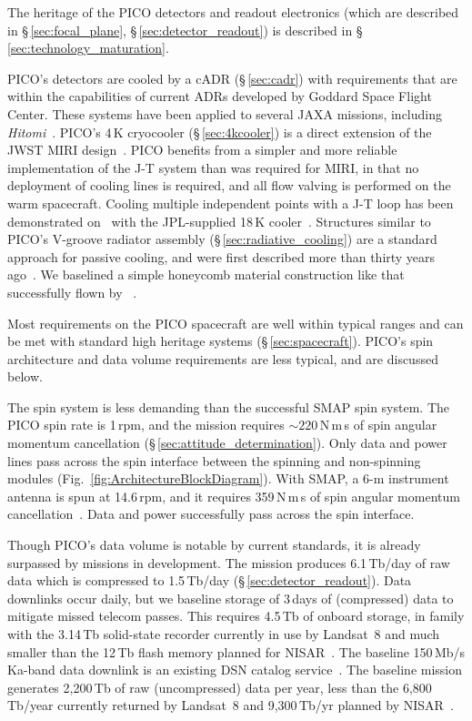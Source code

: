 The heritage of the PICO detectors and readout electronics (which are described in \S\,\ref{sec:focal_plane}, \S\,\ref{sec:detector_readout}) is described in \S\,\ref{sec:technology_maturation}.

PICO's detectors are cooled by a cADR (\S\,\ref{sec:cadr}) with requirements that are within the capabilities of current ADRs developed by Goddard Space Flight Center. These systems have been applied to several JAXA missions, including \textit{Hitomi}~\citep{Shirron2016}. PICO's 4\,K cryocooler (\S\,\ref{sec:4kcooler}) is a direct extension of the JWST MIRI design~\citep{Durand2008,Rabb2013}. PICO benefits from a simpler and more reliable implementation of the J-T system than was required for MIRI, in that no deployment of cooling lines is required, and all flow valving is performed on the warm spacecraft. Cooling multiple independent points with a J-T loop has been demonstrated on \planck\ with the JPL-supplied 18\,K cooler~\citep{Planck2011}. Structures similar to PICO's V-groove radiator assembly (\S\,\ref{sec:radiative_cooling}) are a standard approach for passive cooling, and were first described more than thirty years ago~\citep{Bard1987}. We baselined a simple honeycomb material construction like that successfully flown by \planck~\citep{ESA2009,Planck2011}.


Most requirements on the PICO spacecraft are well within typical ranges and can be met with standard high heritage systems (\S\,\ref{sec:spacecraft}). PICO's spin architecture and data volume requirements are less typical, and are discussed below.

The spin system is less demanding than the successful SMAP spin system. The PICO spin rate is 1\,rpm, and the mission requires $\sim220$\,N\,m\,s of spin angular momentum cancellation (\S\,\ref{sec:attitude_determination}).
Only data and power lines pass across the spin interface between the spinning and non-spinning modules (Fig.~\ref{fig:ArchitectureBlockDiagram}). With SMAP, a 6-m instrument antenna is spun at 14.6\,rpm, and it requires  359\,N\,m\,s of spin angular momentum cancellation~\citep{Brown2016}. Data and power successfully pass across the spin interface. 

Though PICO's data volume is notable by current standards, it is already surpassed by missions in development. The mission produces 6.1\,Tb/day of raw data which is compressed to 1.5\,Tb/day (\S\,\ref{sec:detector_readout}). Data downlinks occur daily, but we baseline storage of 3\,days of (compressed) data to mitigate missed telecom passes. This requires 4.5\,Tb of onboard storage, in family with the 3.14\,Tb solid-state recorder currently in use by Landsat~8 and much smaller than the 12\,Tb flash memory planned for NISAR~\citep{Jasper2017}. The baseline 150\,Mb/s Ka-band data downlink is an existing DSN catalog service~\citep{DSN2015}. The baseline mission generates 2,200\,Tb of raw (uncompressed) data per year, less than the 6,800\,Tb/year currently returned by Landsat~8 and 9,300\,Tb/yr planned by NISAR~\citep{Jasper2017}.

